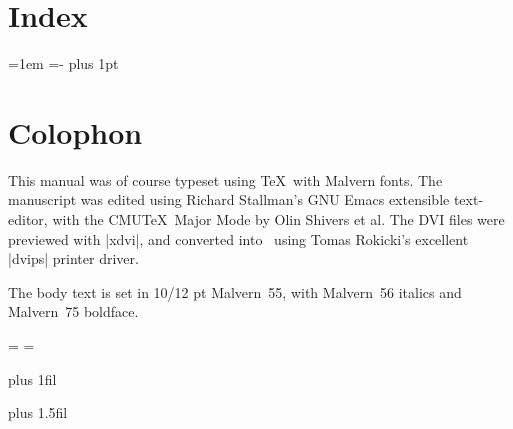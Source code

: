 

\vfill\eject
\begingroup \leftmargin=0pt  \notefonts 
	\section{Index}

	\leftskip=1em \parindent=-\leftskip \parskip=0pt plus 1pt
	\let\vn=\n


\vfill\eject

\endgroup



\iflong

\vfill\eject

\section{Colophon}

	This manual was of course typeset using \TeX\ with Malvern
	fonts.  The manuscript was edited using Richard Stallman's GNU
	Emacs extensible text-editor, with the CMU\TeX\ Major Mode by
	Olin Shivers et al.  The DVI files were previewed with |xdvi|,
	and converted into \PS\ using Tomas Rokicki's excellent |dvips|
	printer driver.

	The body text is set in 10/12 pt Malvern~55, with Malvern~56
	italics and Malvern~75 boldface.

\fi
	

\vfill\eject
{}
\mark{{}{}}

\begingroup
\headline={\hfil} \footline={\hfil}
\iftwosided

\null
\vskip 0pt plus 1fil


\vskip 0pt plus 1.5fil
\eject

\line{}\vfill\eject		%
	
\fi

\null
\vfill

\vskip 24pt
\vskip 18pt
\vskip36pt
\vfill

